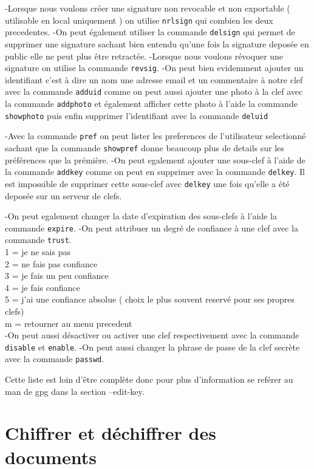 -Lorsque nous voulons créer une signature non revocable et non exportable ( utilisable en local uniquement ) on utilise \texttt{nrlsign}
 qui combien les deux precedentes.
-On peut également utiliser la commande \texttt{delsign} qui permet de supprimer une signature sachant bien entendu qu'une fois la signature
 deposée en public elle ne peut plus être  retractée.
-Lorsque nous voulons révoquer une signature on utilise la commande \texttt{revsig}.
-On peut bien evidemment ajouter un identifiant c'est à dire un nom une adresse email et un commentaire à notre clef avec 
la commande \texttt{adduid} comme on peut aussi  ajouter une photo à la clef avec la commande \texttt{addphoto} et également afficher 
cette photo à l'aide la commande \texttt{showphoto} puis enfin supprimer l'identifiant avec la commande \texttt{deluid}

-Avec la commande \texttt{pref} on peut lister les preferences de l'utilisateur selectionné sachant que la commande \texttt{showpref}
 donne beaucoup plus de details sur les préférences que la prémière.
-On peut egalement ajouter une sous-clef à l'aide de la commande \texttt{addkey} comme on peut en supprimer avec la commande \texttt{delkey}.
Il est impossible de supprimer cette sous-clef avec \texttt{delkey} une fois qu'elle a été deposée sur un serveur de clefs.

-On peut egalement changer la date d'expiration des sous-clefs à l'aide la commande \texttt{expire}.
-On peut attribuer un degré de confiance à une clef avec la commande \texttt{trust}.\\
  1 = je ne sais pas\\
  2 = ne fais pas confiance\\
  3 = je fais un peu confiance\\
  4 = je fais confiance\\
  5 = j'ai une confiance absolue ( choix le plus souvent reservé pour ses propres clefs)\\
  m = retourner au menu precedent\\
  
-On peut aussi désactiver ou activer une clef respectivement avec la commande \texttt{disable} et \texttt{enable}.
-On peut aussi changer la phrase de passe de la clef secrète avec la commande \texttt{passwd}.


Cette liste est loin d'être complète donc pour plus d'information se reférer au man de gpg dans la section --edit-key.\\

\section{Chiffrer et déchiffrer des documents}
  
